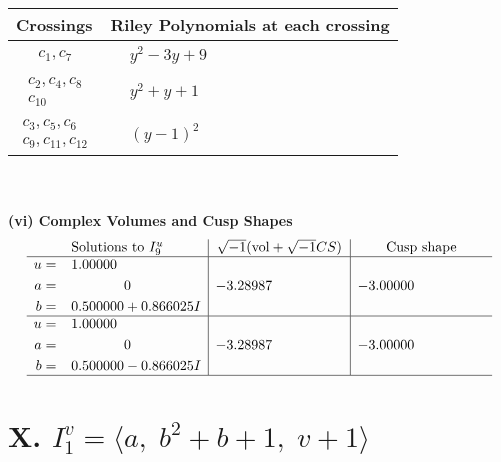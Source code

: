 \documentclass[1p]{elsarticle_modified}
\theoremstyle{definition}
\newcommand{\I}{\sqrt{-1}}
\begin{document}
\begin{tabular}{m{50pt}|m{274pt}}
Crossings & \hspace{64pt}Riley Polynomials at each crossing \\
\hline $$\begin{aligned}c_{1},c_{7}\end{aligned}$$&$\begin{aligned}
&y^2-3 y+9
\end{aligned}$\\
\hline $$\begin{aligned}c_{2},c_{4},c_{8}\\c_{10}\end{aligned}$$&$\begin{aligned}
&y^2+y+1
\end{aligned}$\\
\hline $$\begin{aligned}c_{3},c_{5},c_{6}\\c_{9},c_{11},c_{12}\end{aligned}$$&$\begin{aligned}
&(y-1)^2
\end{aligned}$\\
\hline
\end{tabular}\\~\\
\newpage\flushleft \textbf{(vi) Complex Volumes and Cusp Shapes}
$$\begin{array}{c|c|c}  
\text{Solutions to }I^u_{9}& \I (\text{vol} + \sqrt{-1}CS) & \text{Cusp shape}\\
 \hline 
\begin{aligned}
u &= \phantom{-}1.00000\phantom{ +0.000000I} \\
a &= \phantom{-0.000000 } 0 \\
b &= \phantom{-}0.500000 + 0.866025 I\end{aligned}
 & -3.28987\phantom{ +0.000000I} & -3.00000\phantom{ +0.000000I} \\ \hline\begin{aligned}
u &= \phantom{-}1.00000\phantom{ +0.000000I} \\
a &= \phantom{-0.000000 } 0 \\
b &= \phantom{-}0.500000 - 0.866025 I\end{aligned}
 & -3.28987\phantom{ +0.000000I} & -3.00000\phantom{ +0.000000I}\\
 \hline 
 \end{array}$$\newpage\newpage\renewcommand{\arraystretch}{1}
\centering \section*{X. $I^v_{1}= \langle a,\;b^2+b+1,\;v+1 \rangle$}
\end{document}
